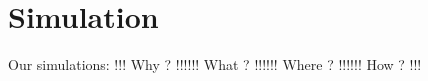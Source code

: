 \chapter{Simulation}\label{ch:simulation}
Our simulations:
!!! Why ? !!!!!! What ? !!!!!! Where ? !!!!!! How ? !!!
